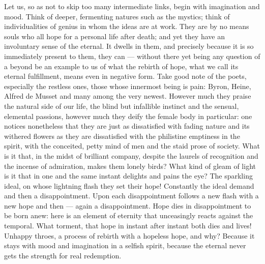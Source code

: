 \documentclass[12pt,a4paper,openany]{book}
\newcommand{\opage}[1]{\marginnote{\footnotesize\textit{[#1]}}}
\begin{document}
Let us, so as not to skip too many intermediate links,
begin with imagination and mood. Think
of deeper, fermenting natures such as the mystics; think
of individualities of genius in whom the ideas are at work.
They are by no means souls who all hope for
a personal life after death; and yet they have an involuntary
sense of the eternal. It dwells in them,
and precisely because it is so immediately present to them,
they can --- without there yet being any question of a beyond
be an example to us of what the rebirth of hope,
what we call its eternal fulfillment, means even in negative
form. Take good note of the poets,
especially the restless ones, those whose innermost being is pain:
Byron, Heine, Alfred de Musset and many among the
very newest. However much they praise the natural side of our life,
the blind but infallible instinct and the sensual,
elemental passions, however much they deify
the female body in particular: one notices nonetheless that
they are just as dissatisfied with fading nature and
\setcounter{footnote}{0}%
\opage{32}its withered flowers as they are dissatisfied with the
philistine emptiness in the spirit, with the conceited,
petty mind of men and the staid prose of society.
What is it that, in the midst of brilliant company,
despite the laurels of recognition and the incense of admiration,
makes them lonely birds? What kind of
gleam of light is it that in one and the same instant delights and pains
the eye? The sparkling ideal, on whose lightning flash they set their hope!
Constantly the ideal demand and then a disappointment. Upon
each disappointment follows a new flash with a new hope and
then --- again a disappointment. Hope dies in disappointment
to be born anew: here is an element of eternity that
unceasingly reacts against the temporal. What torment, that
hope in instant after instant both dies and lives! Unhappy
throes, a process of rebirth with a hopeless hope, and
why? Because it stays with mood and imagination
in a selfish spirit, because the eternal never gets the strength for
real redemption.
\end{document}
